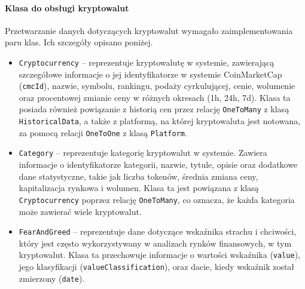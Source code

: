 \paragraph{Klasa do obsługi kryptowalut}
Przetwarzanie danych dotyczących kryptowalut wymagało zaimplementowania paru klas. Ich szczegóły opisano poniżej.
\begin{itemize}
	\item \texttt{Cryptocurrency} -- reprezentuje kryptowalutę w systemie, zawierającą szczegółowe informacje o jej identyfikatorze w systemie CoinMarketCap (\texttt{cmcId}), nazwie, symbolu, rankingu, podaży cyrkulującej, cenie, wolumenie oraz procentowej zmianie ceny w różnych okresach (1h, 24h, 7d). Klasa ta posiada również powiązanie z historią cen przez relację \texttt{OneToMany} z klasą \texttt{HistoricalData}, a także z platformą, na której kryptowaluta jest notowana, za pomocą relacji \texttt{OneToOne} z klasą \texttt{Platform}.
	\item \texttt{Category} -- reprezentuje kategorię kryptowalut w systemie. Zawiera informacje o identyfikatorze kategorii, nazwie, tytule, opisie oraz dodatkowe dane statystyczne, takie jak liczba tokenów, średnia zmiana ceny, kapitalizacja rynkowa i wolumen. Klasa ta jest powiązana z klasą \texttt{Cryptocurrency} poprzez relację \texttt{OneToMany}, co oznacza, że każda kategoria może zawierać wiele kryptowalut. 
	\item \texttt{FearAndGreed} -- reprezentuje dane dotyczące wskaźnika strachu i chciwości, który jest często wykorzystywany w analizach rynków finansowych, w tym kryptowalut. Klasa ta przechowuje informacje o wartości wskaźnika (\texttt{value}), jego klasyfikacji (\texttt{valueClassification}), oraz dacie, kiedy wskaźnik został zmierzony (\texttt{date}).
\end{itemize}

